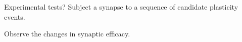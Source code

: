 \documentclass[final,hyperref={pdfpagelabels=false,bookmarks=false}]{beamer}
\begin{document}
\begin{frame}{}
\begin{columns}[t]
\begin{column}{0.33\linewidth}



\begin{block}{Experimental tests?}
%
 Subject a synapse to a sequence of candidate plasticity events.

 Observe the changes in synaptic efficacy.
 
 \begin{center}
   \begin{inlineenumerate}
     \item {} \hspace{0.02\linewidth}
     \item {} \hspace{0.02\linewidth}
     \item {} \hspace{0.02\linewidth}
     \item {} \hspace{0.02\linewidth}

\end{inlineenumerate}
\end{center}
\end{block}
\end{column}
\end{columns}
\end{frame}
\end{document}
